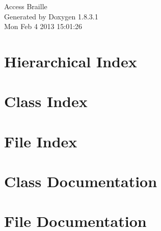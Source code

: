 \documentclass{book}
\begin{document}
\hypersetup{pageanchor=false,citecolor=blue}
\begin{titlepage}
\vspace*{7cm}
\begin{center}
{\Large Access Braille }\\
\vspace*{1cm}
{\large Generated by Doxygen 1.8.3.1}\\
\vspace*{0.5cm}
{\small Mon Feb 4 2013 15:01:26}\\
\end{center}
\end{titlepage}
\clearemptydoublepage
{}
\tableofcontents
\clearemptydoublepage
{}
\hypersetup{pageanchor=true,citecolor=blue}
\chapter{Hierarchical Index}

\chapter{Class Index}

\chapter{File Index}

\chapter{Class Documentation}













\chapter{File Documentation}

























\printindex
\end{document}
